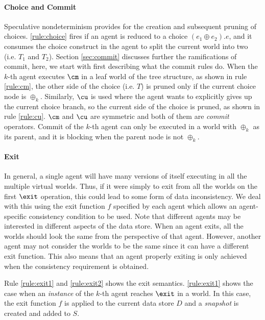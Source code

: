 \paragraph*{Choice and Commit}
Speculative nondeterminism provides for the creation and subsequent
pruning of choices. 
\ref{rule:choice} fires if an agent is reduced to a choice $(e_1\oplus e_2).e$, 
and it consumes the choice construct in the agent to split the current world into two
(i.e. $T_1$ and $T_2$). 
Section \ref{sec:commit} discusses further the ramifications of commit,
here, we start with first describing what the commit rules do.
When the $k$-th agent executes $\cm$ in a leaf world of the tree structure, 
as shown in rule \ref{rule:cm}, the other side of the choice (i.e. $T$) is pruned
only if the current choice node is $\oplus_k$. 
Similarly, $\cu$ is used where the agent wants to explicitly gives up the current choice branch,
so the current side of the choice is pruned, 
as shown in rule \ref{rule:cu}. 
$\cm$ and $\cu$ are symmetric and both of them are {\em commit} operators.
Commit of the $k$-th agent can only be executed in a world with $\oplus_k$ as its parent,
and it is blocking when the parent node is not $\oplus_k$.

\paragraph*{Exit}
In general, a single agent will have many versions of itself executing
in all the multiple virtual worlds.
Thus, if it were simply to exit from all the worlds on the first
$\exit$ operation, this could lead to some form of data inconsistency.
We deal with this using the exit function $f$ specified by each agent which
allows an agent-specific consistency condition to be used.
Note that different agents may be interested in different aspects of the data store. 
When an agent exits, all the worlds should look the same from the perspective of that agent. 
However, another agent may not consider the worlds to be the 
same since it can have a different exit function. 
This also means that an agent properly exiting is only achieved when
the consistency requirement is obtained.

Rule \ref{rule:exit1} and \ref{rule:exit2} shows the exit semantics. 
\ref{rule:exit1} shows the case when an {\em instance} 
of the $k$-th agent reaches $\exit$ in a world. 
In this case, the exit function $f$ is applied to the current data store $D$ and a {\em snapshot} 
is created and added to $S$. 
 
